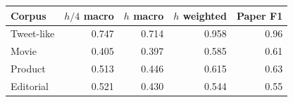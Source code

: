 \begin{tabular}{lrrrr}
\toprule
Corpus & $h/4$ macro & $h$ macro & $h$ weighted & Paper F1\\
\midrule
Tweet-like & 0.747 & 0.714 & 0.958 & 0.96 \\
Movie & 0.405 & 0.397 & 0.585 & 0.61 \\
Product & 0.513 & 0.446 & 0.615 & 0.63 \\
Editorial & 0.521 & 0.430 & 0.544 & 0.55 \\
\bottomrule
\end{tabular}
